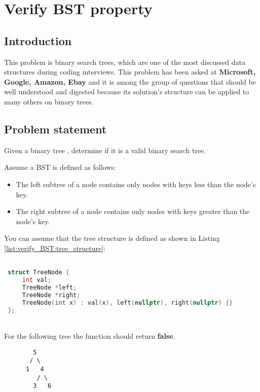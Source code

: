 %

\chapter{Verify BST property}
\label{ch:verify_BST}
\section*{Introduction}
This problem is binary search trees, which are one of the most discussed data structures during coding interviews. This problem has been asked at \textbf{Microsoft, Google, Amazon, Ebay} and it is among the group of questions that should be well understood and digested because its solution's structure can be applied to many others on binary trees.

\section{Problem statement}
\begin{exercise}
Given a binary tree \cite{cit:wiki:BST}, determine if it is a valid binary search tree.

Assume a BST is defined as follows:
\begin{itemize}
    \item The left subtree of a node contains only nodes with keys less than the node's key.
    \item The right subtree of a node contains only nodes with keys greater than the node's key.
\end{itemize}
You can assume that the tree structure is defined as shown in Listing \ref{list:verify_BST:tree_structure}: 

\end{exercise}

\begin{lstlisting}[language=c++, caption=Binary tree definition used in this exercice.,label=list:verify_BST:tree_structure]

 struct TreeNode {
     int val;
     TreeNode *left;
     TreeNode *right;
     TreeNode(int x) : val(x), left(nullptr), right(nullptr) {}
 };
 \end{lstlisting}


\begin{example}
	\hfill \\
	For the following tree the function should return \textbf{false}.
	\begin{verbatim}
	    5
	   / \
	  1   4
	     / \
	    3   6
	\end{verbatim}
\end{example}

